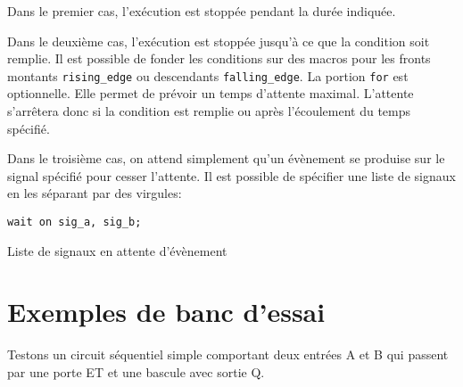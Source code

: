 \documentclass[letter, oneside]{book}
\begin{document}
\begin{enumerate}
Dans le premier cas, l'exécution est stoppée pendant la durée
indiquée.

Dans le deuxième cas, l'exécution est stoppée jusqu'à ce que la
condition soit remplie. Il est possible de fonder les conditions sur
des macros pour les fronts montants \texttt{rising\_edge} ou descendants
\texttt{falling\_edge}. La portion \texttt{for} est optionnelle. Elle permet de
prévoir un temps d'attente maximal. L'attente s'arrêtera donc si la
condition est remplie ou après l'écoulement du temps spécifié.

Dans le troisième cas, on attend simplement qu'un évènement se
produise sur le signal spécifié pour cesser l'attente. Il est possible
de spécifier une liste de signaux en les séparant par des virgules:

\begin{listing}[htbp]
\begin{verbatim}
wait on sig_a, sig_b;
\end{verbatim}
\caption{Liste de signaux en attente d'évènement}
\end{listing}
\end{enumerate}


\section{Exemples de banc d'essai}
\label{sec:orgb70f342}

Testons un circuit séquentiel simple comportant deux entrées A et
B qui passent par une porte ET et une bascule avec sortie Q.
\end{document}
